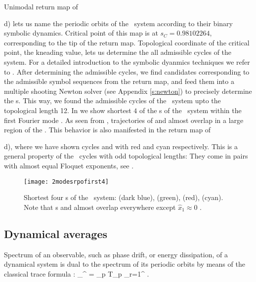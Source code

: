 {{{{{{{{Unimodal return map of \,{d) lets us name the periodic orbits of the \twomode\ system according to their binary symbolic dynamics. Critical point of this map is at $s_C=0.98102264$, corresponding to the tip of the return map. Topological coordinate of the critical point, the kneading value, lets us determine the all admissible cycles of the system. For a detailed introduction to the symbolic dyanmics techniques we refer to . After determining the admissible cycles, we find candidates corresponding to the admissible symbol sequences from the return map, and feed them into a multiple shooting Newton solver (see Appendix \ref{s:newton}) to precisely determine the \rpo s. This way, we found the admissible cycles of the \twomode\ system upto the topological length 12. In  we show shortest $4$ of the \rpo s of the \twomode\ system within the first Fourier mode \slicePlane . As seen from , trajectories of  and  almost overlap in a large region of the \statesp . This behavior is also manifested in the return map of \,{d), where we have shown cycles  and  with red and cyan respectively. This is a general property of the \twomode\ cycles with odd topological lengths: They come in pairs with almost equal Floquet exponents, see .

\begin{figure}%
\centering
 \texttt{[image: 2modesrpofirst4]}
\caption{Shortest four \rpo s of the \twomode\ system:  (dark blue),  (green),  (red),  (cyan). Note that \rpo s  and  almost overlap everywhere except $\hat{x}_1 \approx 0$ .}
\label{f-2modesrpofirst4}
\end{figure}

\subsection{Dynamical averages}
\label{s:DynAvers}

Spectrum of an observable, such as phase drift, or energy dissipation, of a dynamical system is dual to the spectrum of its periodic orbits by means of the classical trace formula :
\beq
\sum_{}^{\infty}  = \sum_p T_p \sum_{r=1}^{\infty}  .

}}}}}}}}}}
